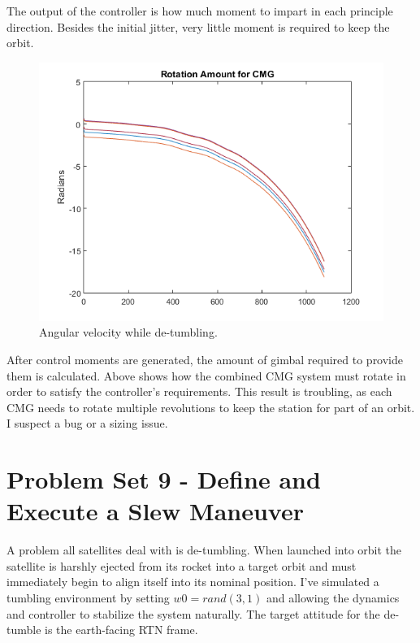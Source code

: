 \documentclass[12pt, letterpaper]{article}
\begin{document}
The output of the controller is how much moment to impart in each principle direction. Besides the initial jitter, very little moment is required to keep the orbit.

\begin{figure}[H]
	\centering
	\includegraphics[scale=0.8]{ps8_05}
	\caption{Angular velocity while de-tumbling.}
	\label{8:angvel}
\end{figure}

After control moments are generated, the amount of gimbal required to provide them is calculated. Above shows how the combined CMG system must rotate in order to satisfy the controller's requirements. This result is troubling, as each CMG needs to rotate multiple revolutions to keep the station for part of an orbit. I suspect a bug or a sizing issue.



\section{Problem Set 9 - Define and Execute a Slew Maneuver}
A problem all satellites deal with is de-tumbling. When launched into orbit the satellite is harshly ejected from its rocket into a target orbit and must immediately begin to align itself into its nominal position. I've simulated a tumbling environment by setting $w0=rand(3,1)$ and allowing the dynamics and controller to stabilize the system naturally. The target attitude for the de-tumble is the earth-facing RTN frame.
\end{document}
